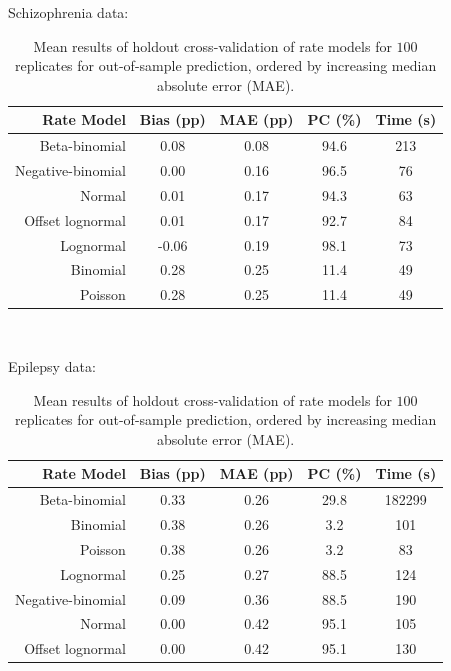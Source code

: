 \begin{table}
\caption{Mean results of holdout cross-validation of rate models for
  $100$ replicates for out-of-sample prediction, ordered by increasing
  median absolute error (MAE).}
\label{rate-comparison}

Schizophrenia data:
\begin{center}
\begin{tabular}{|r|c|c|c|c|}
\hline
Rate Model         &  Bias (pp) &   MAE (pp) &PC (\%) &  Time (s)\\
\hline
Beta-binomial      &       0.08 &       0.08 &  94.6 &   213 \\
Negative-binomial  &       0.00 &       0.16 &  96.5 &    76 \\
Normal             &       0.01 &       0.17 &  94.3 &    63 \\
Offset lognormal   &       0.01 &       0.17 &  92.7 &    84 \\
Lognormal          &      -0.06 &       0.19 &  98.1 &    73 \\
Binomial           &       0.28 &       0.25 &  11.4 &    49 \\
Poisson            &       0.28 &       0.25 &  11.4 &    49 \\
\hline
\end{tabular}
\\[.1in]
\end{center}
Epilepsy data:
\begin{center}
\begin{tabular}{|r|c|c|c|c|}
\hline
Rate Model         &  Bias (pp) &   MAE (pp) &PC (\%) &  Time (s)\\
\hline
Beta-binomial      &  0.33      &       0.26 &  29.8 &  182299 \\
Binomial           &  0.38      &       0.26 &   3.2 &     101 \\
Poisson            &  0.38      &       0.26 &   3.2 &      83 \\
Lognormal          &  0.25      &       0.27 &  88.5 &     124 \\
Negative-binomial  &  0.09      &       0.36 &  88.5 &     190 \\
Normal             &  0.00      &       0.42 &  95.1 &     105 \\
Offset lognormal   &  0.00      &       0.42 &  95.1 &     130 \\
\hline
\end{tabular}
\end{center}
\end{table}

